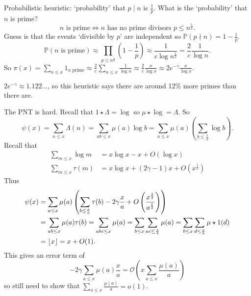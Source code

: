 \documentclass{article}
\newcommand{\bigO}{\mathcal{O}}
\DeclarePairedDelimiter\floor{\lfloor}{\rfloor}
\begin{document}
Probabilistic heuristic: `probability' that $p \mid n$ is $\frac{1}{p}$.
What is the `probability' that $n$ is prime?
\begin{equation*}
  n\text{ is prime} \iff n\text{ has no prime divisors } p \leq n^{\frac{1}{2}}.
\end{equation*}
Guess is that the events `divisible by $p$' are independent so $\mathbb{P}(p \nmid n) = 1 - \frac{1}{p}$.
\begin{equation*}
  \mathbb{P}(n \text{ is prime}) \approx \prod_{p \leq n^{\frac{1}{2}}} \left(1 - \frac{1}{p}\right) \approx \frac{1}{c \log n^{\frac{1}{2}}} = \frac{2}{c} \frac{1}{\log n}.
\end{equation*}
So $\pi(x) = \sum_{n \leq x} 1_{n \text{ prime}} \approx \frac{2}{c} \sum_{n \leq x} \frac{1}{\log n} \approx \frac{2}{c} \frac{x}{\log x} \approx 2 e^{-\gamma} \frac{x}{\log x}$.

$2 e^{-\gamma} \approx 1.122\dots$, so this heuristic says there are around 12\% more primes than there are.

The PNT is hard.
Recall that $1 \star \Lambda = \log$ so $\mu \star \log = \Lambda$.
So
\begin{equation*}
  \psi(x) = \sum_{n \leq x} \Lambda(n) = \sum_{ab \leq x} \mu(a) \log b = \sum_{a \leq x} \mu(a) \left(\sum_{b \leq \frac{x}{a}} \log b\right).
\end{equation*}
Recall that
\begin{align*}
  \sum_{m \leq x} \log m &= x \log x - x + O(\log x) \\
  \sum_{m \leq x} \tau(m) &= x \log x + (2 \gamma - 1) x + O(x^{\frac{1}{2}})
\end{align*}
Thus
\begin{align*}
  \psi(x) &= \sum_{a \leq x} \mu(a) \left(\sum_{b \leq \frac{x}{a}} \tau(b) - 2 \gamma \frac{x}{a} + O\left(\frac{x^{\frac{1}{2}}}{a^{\frac{1}{2}}}\right)\right) \\
          &= \sum_{ab \leq x} \mu(a) \tau(b) = \sum_{abc \leq x} \mu(a) = \sum_{b \leq x} \sum_{ac \leq \frac{x}{b}} \mu(a) = \sum_{b \leq x} \sum_{d \leq \frac{x}{b}} \mu \star 1(d) \\
          &= \floor{x} = x + O(1).
\end{align*}
This gives an error term of
\begin{equation*}
  -2 \gamma \sum_{a \leq x} \mu(a) \frac{x}{a} = \bigO(x \sum_{a \leq x} \frac{\mu(a)}{a})
\end{equation*}
so still need to show that $\sum_{a \leq x} \frac{\mu(a)}{a} = o(1)$.
\clearpage
\printnomenclature
\printindex
\end{document}
